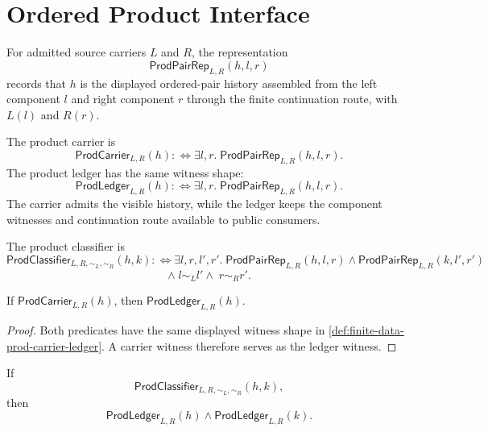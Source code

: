 \section{Ordered Product Interface}
\label{sec:finite-data-prod-interface}

\begin{definition}
\label{def:finite-data-prod-pair-rep}
For admitted source carriers $L$ and $R$, the representation
$$
\mathsf{ProdPairRep}_{L,R}(h,l,r)
$$
records that $h$ is the displayed ordered-pair history assembled from the
left component $l$ and right component $r$ through the finite continuation
route, with $L(l)$ and $R(r)$.
\end{definition}

\begin{definition}
\label{def:finite-data-prod-carrier-ledger}
The product carrier is
$$
\mathsf{ProdCarrier}_{L,R}(h)
:\Longleftrightarrow
\exists l,r.\;\mathsf{ProdPairRep}_{L,R}(h,l,r).
$$
The product ledger has the same witness shape:
$$
\mathsf{ProdLedger}_{L,R}(h)
:\Longleftrightarrow
\exists l,r.\;\mathsf{ProdPairRep}_{L,R}(h,l,r).
$$
The carrier admits the visible history, while the ledger keeps the component
witnesses and continuation route available to public consumers.
\end{definition}

\begin{definition}
\label{def:finite-data-prod-classifier}
The product classifier is
$$
\mathsf{ProdClassifier}_{L,R,\sim_L,\sim_R}(h,k)
:\Longleftrightarrow
\exists l,r,l',r'.\;
\mathsf{ProdPairRep}_{L,R}(h,l,r)
\wedge
\mathsf{ProdPairRep}_{L,R}(k,l',r')
$$
$$
\wedge\; l\sim_L l'
\wedge\; r\sim_R r'.
$$
\end{definition}

\begin{theorem}
\label{thm:finite-data-prod-carrier-ledger}
If $\mathsf{ProdCarrier}_{L,R}(h)$, then
$\mathsf{ProdLedger}_{L,R}(h)$.
\end{theorem}

\begin{proof}
Both predicates have the same displayed witness shape in
\autoref{def:finite-data-prod-carrier-ledger}.  A carrier witness therefore
serves as the ledger witness.
\end{proof}

\begin{theorem}
\label{thm:finite-data-prod-classifier-ledgers}
If
$$
\mathsf{ProdClassifier}_{L,R,\sim_L,\sim_R}(h,k),
$$
then
$$
\mathsf{ProdLedger}_{L,R}(h)
\wedge
\mathsf{ProdLedger}_{L,R}(k).
$$
\end{theorem}

